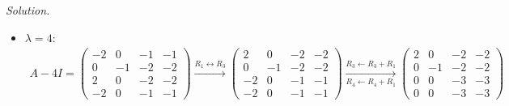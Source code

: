 \documentclass[12pt]{article}
\theoremstyle{definition}
\newenvironment{solution}{\par\noindent\textit{Solution.}\ }{\par\smallskip}
\begin{document}
\begin{solution}
\begin{itemize}
\[\begin{gathered}
\xrightarrow{R_2\leftarrow-\frac12R_2}
\begin{pmatrix}-1&0&-1&-1\\0&0&1&1\\0&0&-3&-4\\0&0&1&2\end{pmatrix}
\\
\xrightarrow[R_4\leftarrow R_4-R_2]{R_1\leftarrow R_1+R_2,\ R_3\leftarrow R_3+3R_2}
\begin{pmatrix}-1&0&0&0\\0&0&1&1\\0&0&0&-1\\0&0&0&1\end{pmatrix}
\xrightarrow[R_4\leftarrow R_4+R_3]{R_2\leftarrow R_2+R_3}
\begin{pmatrix}-1&0&0&0\\0&0&1&0\\0&0&0&-1\\0&0&0&0\end{pmatrix}
\\
\xrightarrow[R_3\leftarrow-R_3]{R_1\leftarrow-R_1}
\begin{pmatrix}1&0&0&0\\0&0&1&0\\0&0&0&1\\0&0&0&0\end{pmatrix}
\end{gathered}
\]
The free unknown is \(x_2\); the special solution \(p_3=e_2\) is a basis of \(\mathcal N(A-3I)\).
\item \(\lambda=4\):
\[
\begin{gathered}
A-4I=\begin{pmatrix}-2&0&-1&-1\\0&-1&-2&-2\\2&0&-2&-2\\-2&0&-1&-1\end{pmatrix}
\xrightarrow{R_1\leftrightarrow R_3}
\begin{pmatrix}2&0&-2&-2\\0&-1&-2&-2\\-2&0&-1&-1\\-2&0&-1&-1\end{pmatrix}
\xrightarrow[R_4\leftarrow R_4+R_1]{R_3\leftarrow R_3+R_1}
\begin{pmatrix}2&0&-2&-2\\0&-1&-2&-2\\0&0&-3&-3\\0&0&-3&-3\end{pmatrix}
\\

\end{gathered}\]
\end{itemize}
\end{solution}
\end{document}
